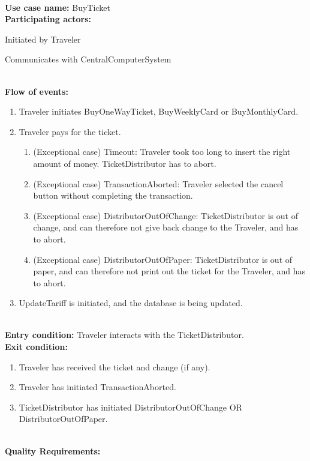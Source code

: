 \HRule \\[0.4cm]
\textbf{Use case name:} BuyTicket
\HRule \\[0.4cm]
\textbf{Participating actors:}
\begin{list_type}
	\item Initiated by Traveler
	\item Communicates with CentralComputerSystem
\end{list_type}
\HRule \\[0.4cm]
\textbf{Flow of events:}
\begin{enumerate}
	\item Traveler initiates BuyOneWayTicket, BuyWeeklyCard or BuyMonthlyCard.
	\item Traveler pays for the ticket.
	\begin{enumerate}
		\item (Exceptional case) Timeout: Traveler took too long to insert the right amount of money. TicketDistributor has to abort.
		\item (Exceptional case) TransactionAborted: Traveler selected the cancel button without completing the transaction.
		\item (Exceptional case) DistributorOutOfChange: TicketDistributor is out of change, and can therefore not give back change to the Traveler, and has to abort.
		\item (Exceptional case) DistributorOutOfPaper: TicketDistributor is out of paper, and can therefore not print out the ticket for the Traveler, and has to abort.
	\end{enumerate}
	\item UpdateTariff is initiated, and the database is being updated.
\end{enumerate}
\HRule \\[0.4cm]
\textbf{Entry condition:} Traveler interacts with the TicketDistributor.
\HRule \\[0.4cm]
\textbf{Exit condition:}
\begin{enumerate}
	\item Traveler has received the ticket and change (if any).
	\item Traveler has initiated TransactionAborted.
	\item TicketDistributor has initiated DistributorOutOfChange OR DistributorOutOfPaper.
\end{enumerate}
\HRule \\[0.4cm]
\textbf{Quality Requirements:}
\HRule \\[0.4cm]
